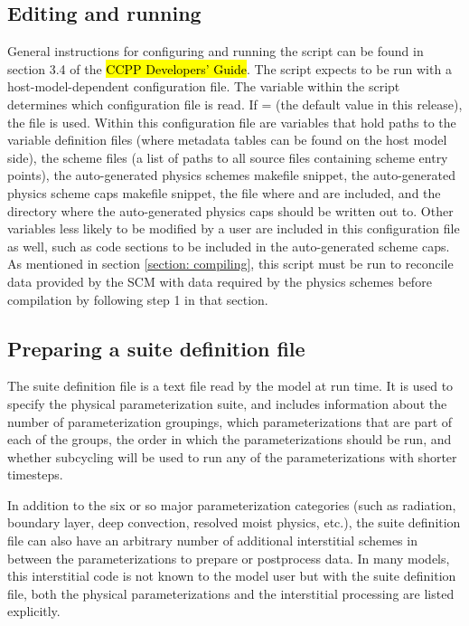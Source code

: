 \subsection{Editing and running }

General instructions for configuring and running the  script can be found in section 3.4 of the \hl{CCPP Developers' Guide}. The script expects to be run with a host-model-dependent configuration file. The  variable within the script determines which configuration file is read. If  =  (the default value in this release), the file  is used. Within this configuration file are variables that hold paths to the variable definition files (where metadata tables can be found on the host model side), the scheme files (a list of paths to all source files containing scheme entry points), the auto-generated physics schemes makefile snippet, the auto-generated physics scheme caps makefile snippet, the file where  and  are included, and the directory where the auto-generated physics caps should be written out to. Other variables less likely to be modified by a user are included in this configuration file as well, such as code sections to be included in the auto-generated scheme caps. As mentioned in section \ref{section: compiling}, this script must be run to reconcile data provided by the SCM with data required by the physics schemes before compilation by following step 1 in that section.

\subsection{Preparing a suite definition file}
The suite definition file is a text file read by the model at run time. It is used to specify the physical parameterization suite, and includes information about the number of parameterization groupings, which parameterizations that are part of each of the groups, the order in which the parameterizations should be run, and whether subcycling will be used to run any of the parameterizations with shorter timesteps.

In addition to the six or so major parameterization categories (such as radiation, boundary layer, deep convection, resolved moist physics, etc.), the suite definition file can also have an arbitrary number of additional interstitial schemes in between the parameterizations to prepare or postprocess data. In many models, this interstitial code is not known to the model user but with the suite definition file, both the physical parameterizations and the interstitial processing are listed explicitly. 

